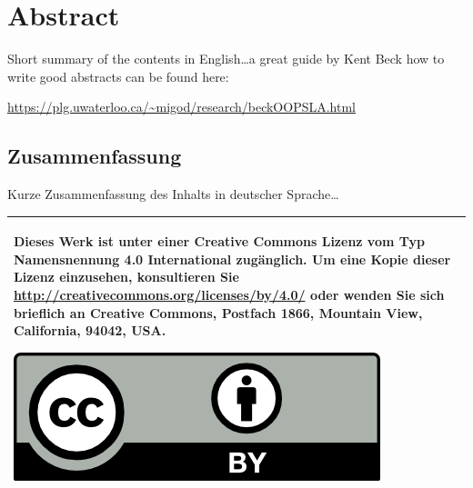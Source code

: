 \begingroup
\let\clearpage\relax
\let\cleardoublepage\relax
\let\cleardoublepage\relax


\ifx\myLanguage\english

\chapter*{Abstract}
Short summary of the contents in English\dots a great guide by 
Kent Beck how to write good abstracts can be found here:  
\begin{center}
\url{https://plg.uwaterloo.ca/~migod/research/beckOOPSLA.html}
\end{center}

\vfill

\fi

\begin{otherlanguage}{ngerman}
\chapter*{Zusammenfassung}
Kurze Zusammenfassung des Inhalts in deutscher Sprache\dots 
\end{otherlanguage}

\endgroup			

\vfill

\begin{tabular}{|p{}|}
  \hline
  Dieses Werk ist unter einer Creative Commons Lizenz vom Typ Namensnennung 4.0 International zugänglich. Um eine Kopie dieser Lizenz einzusehen, konsultieren Sie \url{http://creativecommons.org/licenses/by/4.0/} oder wenden Sie sich brieflich an Creative Commons, Postfach 1866, Mountain View, California, 94042, USA.
  \begin{center}
	\includegraphics[width=.6\textwidth]{images/by.png}
  \end{center}\\
  \hline
\end{tabular}
